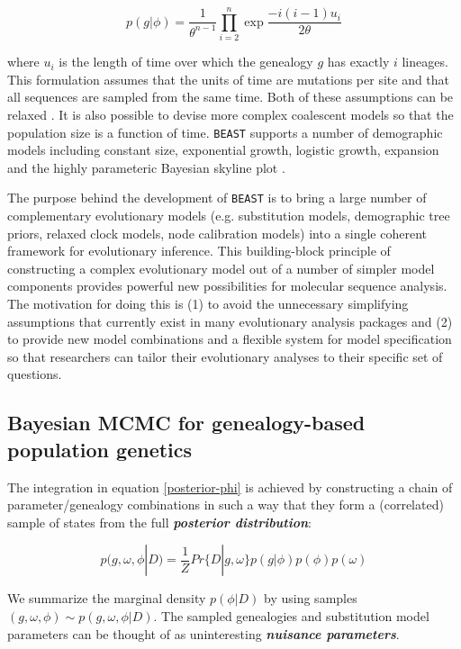 \documentclass[cup7b, english]{cupbook}
\begin{document}
 \begin{equation}
p(g|\phi) = \frac{1}{\theta^{n-1}}\prod_{i=2}^n \exp\frac{-i(i-1)u_i}{2\theta}
\end{equation}

where $u_i$ is the length of time over which the genealogy $g$ has exactly $i$ lineages.
This formulation assumes that the units of time are mutations per site and that all
sequences are sampled from the same time. Both of these assumptions can be relaxed \cite{DNRS2002}.
It is also possible to devise more complex coalescent models so that the population size
is a function of time. \texttt{BEAST} supports a number of demographic models including
constant size, exponential growth, logistic growth, expansion and the highly parameteric
Bayesian skyline plot \cite{DRSP2005}.

The purpose behind the development of \texttt{BEAST} is to bring a large number
of complementary evolutionary models (e.g. substitution models, demographic tree priors,
 relaxed clock models, node calibration models) into a single coherent
framework for evolutionary inference. This building-block principle of constructing a complex
evolutionary model out of a number of simpler model components provides
powerful new possibilities for molecular sequence analysis. The motivation
for doing this is (1) to avoid the unnecessary simplifying assumptions
that currently exist in many evolutionary analysis packages and (2)
to provide new model combinations and a flexible system for model
specification so that researchers can tailor their evolutionary analyses
to their specific set of questions.

\subsection{Bayesian MCMC for genealogy-based population genetics}

The integration in equation \ref{posterior-phi} is achieved by constructing a chain of
parameter/genealogy combinations in such a way that they form a (correlated) sample
of states from the full \textbf{\textit{posterior distribution}}:

\begin{equation}
p(g, \omega, \phi|D) = \frac{1}{Z} Pr\{D|g, \omega\}p(g|\phi)p(\phi)p(\omega)
\end{equation}

We summarize the marginal density $p(\phi|D)$ by using samples
$(g, \omega, \phi) \sim p(g, \omega, \phi|D)$. The sampled genealogies and
substitution model parameters can be thought of as uninteresting \textbf{\textit{nuisance
parameters}}.
\end{document}

